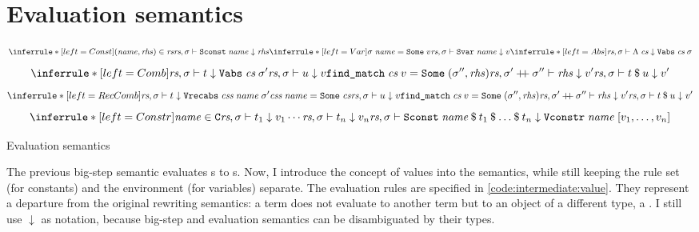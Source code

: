 
\section{Evaluation semantics}
\label{sec:intermediate:value}

\begin{code}[t]
  \[
    \inferrule*[left=Const]{(\mathit{name}, \mathit{rhs}) \in \rs}{\seval{\rs}{\sigma}{\holconst{Sconst}\;\mathit{name}}{\mathit{rhs}}}
    \inferrule*[left=Var]{\sigma\;\mathit{name} = \holconst{Some}\;v}{\seval{\rs}{\sigma}{\holconst{Svar}\;\mathit{name}}{v}}
    \inferrule*[left=Abs]{ }{\seval\rs\sigma{\Lambda\;\cs}{\holconst{Vabs}\;\cs\;\sigma}}
  \]
  \[
    \inferrule*[left=Comb]{
      \seval\rs\sigma{t}{\holconst{Vabs}\;\cs\;\sigma'} \\
      \seval\rs\sigma{u}{v} \\
      \holconst{find\_match}\;\cs\;v = \holconst{Some}\;(\sigma'', \mathit{rhs}) \\
      \seval\rs{\envadd{\sigma'}{\sigma''}}{\mathit{rhs}}{v'}
    }{\seval\rs\sigma{\app t u}{v'}}
  \]
  \[
    \inferrule*[left=RecComb]{
      \seval\rs\sigma{t}{\holconst{Vrecabs}\;\css\;\mathit{name}\;\sigma'} \\
      \css\;\mathit{name} = \holconst{Some}\;\cs \\
      \seval\rs\sigma{u}{v} \\
      \holconst{find\_match}\;\cs\;v = \holconst{Some}\;(\sigma'', \mathit{rhs}) \\
      \seval\rs{\envadd{\sigma'}{\sigma''}}{\mathit{rhs}}{v'}
    }{\seval\rs\sigma{\app t u}{v'}}
  \]
  \[
    \inferrule*[left=Constr]{
      \mathit{name} \in \C \\
      \seval\rs\sigma{t_1}{v_1} \\
      \cdots \\
      \seval\rs\sigma{t_n}{v_n}
    }{\seval\rs\sigma{\holconst{Sconst}\;\mathit{name}\mathbin\$t_1\mathbin\$\ldots\mathbin\$t_n}{\holconst{Vconstr}\;\mathit{name}\;[v_1, \ldots, v_n]}}
  \]
  \caption{Evaluation semantics}
  \label{code:intermediate:value}
\end{code}

The previous big-step semantic evaluates s to s.
Now, I introduce the concept of values into the semantics, while still keeping the rule set (for constants) and the environment (for variables) separate.
The evaluation rules are specified in \cref{code:intermediate:value}.
They represent a departure from the original rewriting semantics:
a term does not evaluate to another term but to an object of a different type, a .
I still use $\downarrow$ as notation, because big-step and evaluation semantics can be disambiguated by their types.

